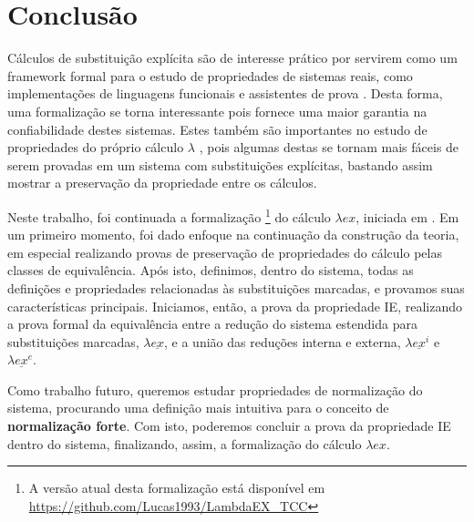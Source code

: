 \chapter{Conclusão}

Cálculos de substituição explícita são de interesse prático por servirem como um
framework formal para o estudo de propriedades de sistemas reais, como
implementações de linguagens funcionais e assistentes de prova \cite{levy1999}.
Desta forma, uma formalização se torna interessante pois fornece uma maior
garantia na confiabilidade destes sistemas. Estes também são importantes no
estudo de propriedades do próprio cálculo $\lambda$ \cite{ben_cbv, ben_beta},
pois algumas destas se tornam mais fáceis de serem provadas em um sistema com
substituições explícitas, bastando assim mostrar a preservação da propriedade
entre os cálculos.

Neste trabalho, foi continuada a formalização \footnote{ A versão atual desta
    formalização está disponível em
    \url{https://github.com/Lucas1993/LambdaEX_TCC}} do cálculo $\lambda ex$,
iniciada em \cite{initial}. Em um primeiro momento, foi dado enfoque na
continuação da construção da teoria, em especial realizando provas de
preservação de propriedades do cálculo pelas classes de equivalência. Após isto,
definimos, dentro do sistema, todas as definições e propriedades relacionadas às
substituições marcadas, e provamos suas características principais. Iniciamos,
então, a prova da propriedade IE, realizando a prova formal da equivalência
entre a redução do sistema estendida para substituições marcadas, $\lambda
\underline{ex}$, e a união das reduções interna e externa, $\lambda
\underline{ex}^i$ e $\lambda \underline{ex}^e$.

Como trabalho futuro, queremos estudar propriedades de normalização do sistema,
procurando uma definição mais intuitiva para o conceito de \textbf{normalização
forte}. Com isto, poderemos concluir a prova da propriedade IE dentro do
sistema, finalizando, assim, a formalização do cálculo $\lambda ex$.

